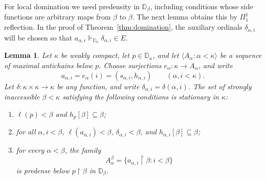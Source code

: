 \documentclass[10pt,a4paper]{amsart}
\newtheorem{lemma}[theorem]{Lemma}
\theoremstyle{definition}
\theoremstyle{remark}
\newcommand{\D}{\mathbb D}
\begin{document}
For local domination we need predensity in \(\D_\beta\), including
conditions whose side functions are arbitrary maps from \(\beta\)
to \(\beta\). The next lemma obtains this by \(\Pi^1_1\)
reflection. In the proof of Theorem~\ref{thm:domination}, the
auxiliary ordinals \(\delta_{\alpha,i}\) will be chosen so that
\(a_{\alpha,i}\Vdash_{\D_\kappa}\delta_{\alpha,i}\in\dot E\).

\begin{lemma}\label{lem:reflection}
Let \(\kappa\) be weakly compact, let \(p\in\D_\kappa\), and
let \(\langle A_\alpha:\alpha<\kappa\rangle\) be a sequence of
maximal antichains below \(p\). Choose surjections
\(e_\alpha:\kappa\to A_\alpha\), and write
\[
 a_{\alpha,i}=e_\alpha(i)
             =(s_{\alpha,i},h_{\alpha,i})
                    \qquad(\alpha,i<\kappa).
\]
Let \(\delta:\kappa\times\kappa\to\kappa\) be any function,
and write \(\delta_{\alpha,i}=\delta(\alpha,i)\).
The set of strongly inaccessible \(\beta<\kappa\) satisfying the
following conditions is stationary in \(\kappa\):
\begin{enumerate}[label=\textup{(\roman*)}]
\item \(\ell(p)<\beta\) and \(h_p[\beta]\subseteq\beta\);
\item for all \(\alpha,i<\beta\),
      \(\ell(a_{\alpha,i})<\beta\),
      \(\delta_{\alpha,i}<\beta\), and
      \(h_{\alpha,i}[\beta]\subseteq\beta\);
\item for every \(\alpha<\beta\), the family
\[
 A_\alpha^\beta=
 \{a_{\alpha,i}\restriction\beta:i<\beta\}
\]
is predense below \(p\restriction\beta\) in \(\D_\beta\).
\end{enumerate}
\end{lemma}
\end{document}
